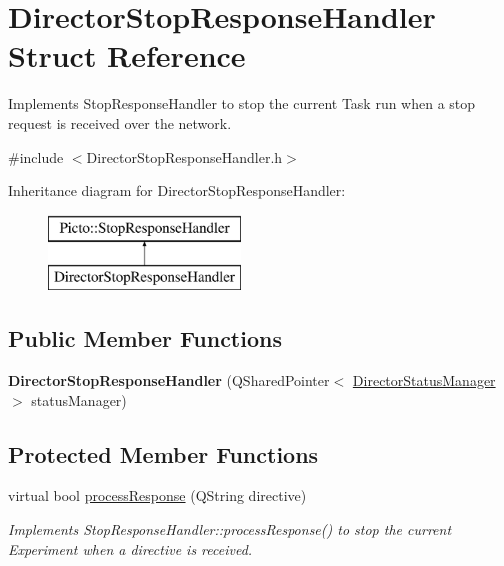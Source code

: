 \hypertarget{struct_director_stop_response_handler}{\section{Director\-Stop\-Response\-Handler Struct Reference}
\label{struct_director_stop_response_handler}
}


Implements Stop\-Response\-Handler to stop the current Task run when a stop request is received over the network.  




{\ttfamily \#include $<$Director\-Stop\-Response\-Handler.\-h$>$}

Inheritance diagram for Director\-Stop\-Response\-Handler\-:\begin{figure}[H]
\begin{center}
\leavevmode
\includegraphics[height=2.000000cm]{struct_director_stop_response_handler}
\end{center}
\end{figure}
\subsection*{Public Member Functions}
\begin{DoxyCompactItemize}
\item 
\hypertarget{struct_director_stop_response_handler_adde0101c655984ee70f7d5f5ca561b4b}{{\bfseries Director\-Stop\-Response\-Handler} (Q\-Shared\-Pointer$<$ \hyperlink{class_director_status_manager}{Director\-Status\-Manager} $>$ status\-Manager)}\label{struct_director_stop_response_handler_adde0101c655984ee70f7d5f5ca561b4b}

\end{DoxyCompactItemize}
\subsection*{Protected Member Functions}
\begin{DoxyCompactItemize}
\item 
\hypertarget{struct_director_stop_response_handler_a7937795378aa3f81df5271d2917b9e44}{virtual bool \hyperlink{struct_director_stop_response_handler_a7937795378aa3f81df5271d2917b9e44}{process\-Response} (Q\-String directive)}\label{struct_director_stop_response_handler_a7937795378aa3f81df5271d2917b9e44}

\begin{DoxyCompactList}\small\item\em Implements Stop\-Response\-Handler\-::process\-Response() to stop the current Experiment when a directive is received. \end{DoxyCompactList}\end{DoxyCompactItemize}



